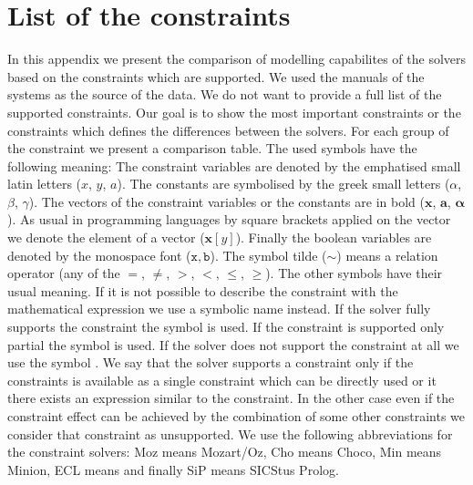 \chapter{List of the constraints}
\label{constraints}

In this appendix we present the comparison of modelling capabilites of the solvers 
based on the constraints which are supported. We used the manuals of the systems \cite{choco:documentation, mozart:documentation, gecode:reference, sicstus:manual, eclipse:cspmanual, eclipse:tutorial, minion:manual, gecode:modelling} as
the source of the data. We do not want to provide a full
list of the supported constraints. Our goal is
to show the most important constraints or the constraints which defines the differences 
between the solvers. For each group of the constraint we present a comparison table. The used symbols have the following meaning:
The constraint variables are denoted by the emphatised small latin letters ($x$, $y$, $a$).
The constants are symbolised by the greek small letters ($\alpha$, $\beta$, $\gamma$).
The vectors of the constraint variables or the constants are in bold ($\mathbf{x}$, $\mathbf{a}$, $\bm{\alpha}$).
As usual in programming languages by square brackets applied on the vector we 
denote the element of a vector ($\mathbf{x}[y]$). Finally the boolean variables are denoted by
the monospace font ($\mathtt{x}, \mathtt{b}$). The symbol tilde ($\sim$) means a relation
operator (any of the $=$, $\neq$, $>$, $<$, $\leq$, $\geq$). The other symbols have their usual meaning.
If it is not possible to describe the constraint with the mathematical expression
we use a symbolic name instead. If the solver fully supports the constraint the \ano symbol
is used. If the constraint is supported only partial the symbol \trochu is used. 
If the solver does not support the constraint at all we use the symbol \vubec. 
We say that the solver supports a constraint only if the constraints is available
as a single constraint which can be directly used or it there exists an expression 
similar to the constraint. In the other case even if the constraint effect can be achieved
by the combination of some other constraints we consider that constraint as unsupported. 
We use the following abbreviations for the constraint solvers:
Moz means Mozart/Oz, Cho means Choco, Min means Minion, ECL means \eclipse and finally
SiP means SICStus Prolog.


